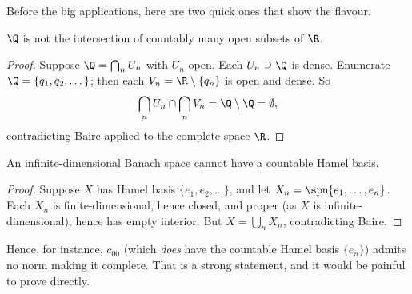 \begin{center}
\end{center}

Before the big applications, here are two quick ones that show the flavour.

\begin{proposition}
	$\Q$ is not the intersection of countably many open subsets of $\R$.
\end{proposition}

\begin{proof}
	Suppose $\Q = \bigcap_n U_n$ with $U_n$ open. Each $U_n \supseteq \Q$ is dense. Enumerate $\Q = \{q_1, q_2, \dots\}$; then each $V_n = \R \setminus \{q_n\}$ is open and dense. So
	$$\bigcap_n U_n \cap \bigcap_n V_n = \Q \setminus \Q = \emptyset,$$
	contradicting Baire applied to the complete space $\R$.
\end{proof}

\begin{proposition}
	An infinite-dimensional Banach space cannot have a countable Hamel basis.
\end{proposition}

\begin{proof}
	Suppose $X$ has Hamel basis $\{e_1, e_2, \dots\}$, and let $X_n = \spn\{e_1,\dots,e_n\}$. Each $X_n$ is finite-dimensional, hence closed, and proper (as $X$ is infinite-dimensional), hence has empty interior. But $X = \bigcup_n X_n$, contradicting Baire.
\end{proof}

\begin{remark}
	Hence, for instance, $c_{00}$ (which \emph{does} have the countable Hamel basis $\{e_n\}$) admits no norm making it complete. That is a strong statement, and it would be painful to prove directly.
\end{remark}

